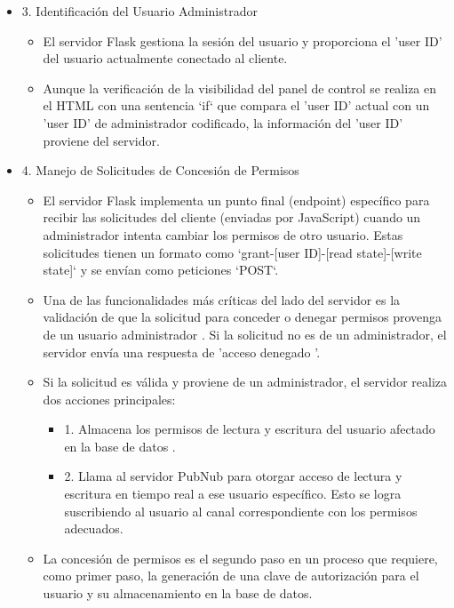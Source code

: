 \documentclass{report}
\begin{document}
\begin{itemize}
    \item 3. Identificación del Usuario Administrador
    \begin{itemize}
        \item El servidor Flask gestiona la sesión del usuario y proporciona el 'user ID' del usuario actualmente conectado al cliente.
        \item Aunque la verificación de la visibilidad del panel de control se realiza en el HTML con una sentencia `if` que compara el 'user ID' 
        actual con un 'user ID' de administrador codificado, la información del 'user ID' proviene del servidor.
    \end{itemize}

    \item 4. Manejo de Solicitudes de Concesión de Permisos
    \begin{itemize}
        \item El servidor Flask implementa un  punto final (endpoint) específico  para recibir las solicitudes del cliente (enviadas por JavaScript) 
        cuando un administrador intenta cambiar los permisos de otro usuario. Estas solicitudes tienen un formato como 
        `grant-[user ID]-[read state]-[write state]` y se envían como peticiones `POST`.
        \item Una de las funcionalidades más críticas del lado del servidor es la  validación de que la solicitud para conceder o denegar permisos 
        provenga de un usuario administrador . Si la solicitud no es de un administrador, el servidor envía una respuesta de  'acceso denegado '.
        \item Si la solicitud es válida y proviene de un administrador, el servidor realiza dos acciones principales:
        \begin{itemize}
            \item 1.   Almacena los permisos  de lectura y escritura del usuario afectado  en la base de datos .
            \item 2.   Llama al servidor PubNub  para  otorgar acceso de lectura y escritura en tiempo real  a ese usuario específico. Esto se logra 
            suscribiendo al usuario al canal correspondiente con los permisos adecuados.
        \end{itemize}
        \item La concesión de permisos es el  segundo paso  en un proceso que requiere, como primer paso, la  generación de una clave de autorización  
        para el usuario y su almacenamiento en la base de datos.
    \end{itemize}


\end{itemize}
\end{document}
